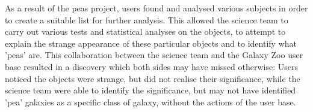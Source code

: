 \documentclass{sigchi}
\begin{document}
As a result of the peas project, users found and analysed various subjects in order to create a suitable list for further analysis. This allowed the science team to carry out various tests and statistical analyses on the objects, to attempt to explain the strange appearance of these particular objects and to identify what 'peas' are. This collaboration between the science team and the Galaxy Zoo user base resulted in a discovery which both sides may have missed otherwise: Users noticed the objects were strange, but did not realise their significance, while the science team were able to identify the significance, but may not have identified 'pea' galaxies as a specific class of galaxy, without the actions of the user base.



\end{document}

